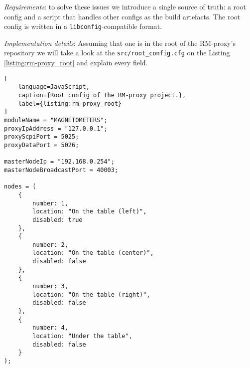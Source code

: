 \textit{Requirements}: to solve these issues we introduce a single source of truth: a root config and a script that handles other configs as the build artefacts. The root config is written in a \texttt{libconfig}-compatible format. 

\textit{Implementation details}: Assuming that one is in the root of the RM-proxy's repository we will take a look at the \texttt{src/root\_config.cfg} on the Listing \ref{listing:rm-proxy_root} and explain every field.

\begin{lstlisting}[
	language=JavaScript,
	caption={Root config of the RM-proxy project.},
	label={listing:rm-proxy_root}
]
moduleName = "MAGNETOMETERS";
proxyIpAddress = "127.0.0.1";
proxyScpiPort = 5025;
proxyDataPort = 5026;

masterNodeIp = "192.168.0.254";
masterNodeBroadcastPort = 40003;

nodes = (
    {
        number: 1,
        location: "On the table (left)",
        disabled: true
    },
    {
        number: 2,
        location: "On the table (center)",
        disabled: false
    },
    {
        number: 3,
        location: "On the table (right)",
        disabled: false
    },
    {
        number: 4,
        location: "Under the table",
        disabled: false
    }
);
\end{lstlisting}

